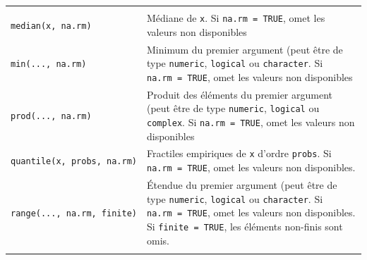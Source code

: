 \documentclass[
  11pt,
]{book}
\numberwithin{equation}{section}
\numberwithin{countremarque}{section}
\begin{document}
\begin{longtable}[]{@{}ll@{}}
\begin{minipage}[t]{0.53\columnwidth}
\end{minipage}\tabularnewline
\begin{minipage}[t]{0.41\columnwidth}\raggedright
\texttt{median(x,\ na.rm)}\strut
\end{minipage} & \begin{minipage}[t]{0.53\columnwidth}\raggedright
Médiane de \texttt{x}. Si \texttt{na.rm\ =\ TRUE}, omet les valeurs non disponibles\strut
\end{minipage}\tabularnewline
\begin{minipage}[t]{0.41\columnwidth}\raggedright
\texttt{min(...,\ na.rm)}\strut
\end{minipage} & \begin{minipage}[t]{0.53\columnwidth}\raggedright
Minimum du premier argument (peut être de type \texttt{numeric}, \texttt{logical} ou \texttt{character}. Si \texttt{na.rm\ =\ TRUE}, omet les valeurs non disponibles\strut
\end{minipage}\tabularnewline
\begin{minipage}[t]{0.41\columnwidth}\raggedright
\texttt{prod(...,\ na.rm)}\strut
\end{minipage} & \begin{minipage}[t]{0.53\columnwidth}\raggedright
Produit des éléments du premier argument (peut être de type \texttt{numeric}, \texttt{logical} ou \texttt{complex}. Si \texttt{na.rm\ =\ TRUE}, omet les valeurs non disponibles\strut
\end{minipage}\tabularnewline
\begin{minipage}[t]{0.41\columnwidth}\raggedright
\texttt{quantile(x,\ probs,\ na.rm)}\strut
\end{minipage} & \begin{minipage}[t]{0.53\columnwidth}\raggedright
Fractiles empiriques de \texttt{x} d'ordre \texttt{probs}. Si \texttt{na.rm\ =\ TRUE}, omet les valeurs non disponibles.\strut
\end{minipage}\tabularnewline
\begin{minipage}[t]{0.41\columnwidth}\raggedright
\texttt{range(...,\ na.rm,\ finite)}\strut
\end{minipage} & \begin{minipage}[t]{0.53\columnwidth}\raggedright
Étendue du premier argument (peut être de type \texttt{numeric}, \texttt{logical} ou \texttt{character}. Si \texttt{na.rm\ =\ TRUE}, omet les valeurs non disponibles. Si \texttt{finite\ =\ TRUE}, les éléments non-finis sont omis.\strut
\end{minipage}\tabularnewline
\begin{minipage}[t]{0.41\columnwidth}\raggedright

\end{minipage}
\end{longtable}
\end{document}
